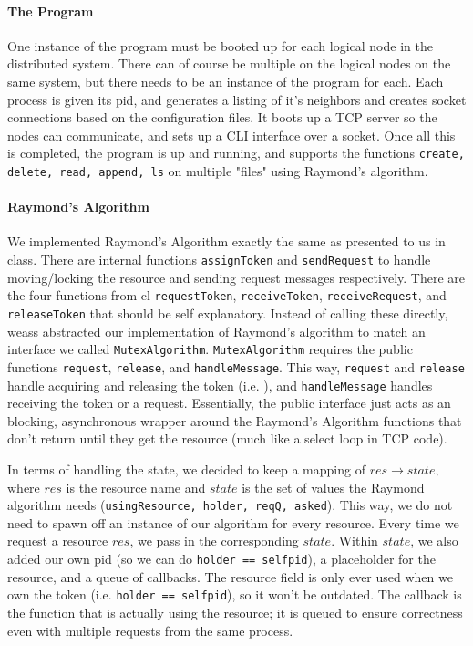 \documentclass{article}
\begin{document}
\paragraph*{The Program}
One instance of the program must be booted up for each logical node in the distributed system. There can of course be multiple on the logical nodes on the same system, but there needs to be an instance of the program for each. Each process is given its pid, and generates a listing of it's neighbors and creates socket connections based on the configuration files. It boots up a TCP server so the nodes can communicate, and sets up a CLI interface over a socket. Once all this is completed, the program is up and running, and supports the functions \texttt{create, delete, read, append, ls} on multiple "files" using Raymond's algorithm.
 

\paragraph*{Raymond's Algorithm}
We implemented Raymond's Algorithm exactly the same as presented to us in class. There are internal functions \texttt{assignToken} and \texttt{sendRequest} to handle moving/locking the resource and sending request messages respectively. There are the four functions from cl \texttt{requestToken}, \texttt{receiveToken}, \texttt{receiveRequest}, and \texttt{releaseToken} that should be self explanatory. Instead of calling these directly, weass abstracted our implementation  of Raymond's algorithm to match an interface we called \texttt{MutexAlgorithm}. \texttt{MutexAlgorithm} requires the public functions \texttt{request}, \texttt{release}, and \texttt{handleMessage}. This way, \texttt{request} and \texttt{release} handle acquiring and releasing the token (i.e. ), and \texttt{handleMessage} handles receiving the token or a request. Essentially, the public interface just acts as an blocking, asynchronous wrapper around the Raymond's Algorithm functions that don't return until they get the resource (much like a select loop in TCP code).

In terms of handling the state, we decided to keep a mapping of $res \to state$, where $res$ is the resource name and $state$ is the set of values the Raymond algorithm needs (\texttt{usingResource, holder, reqQ, asked}). This way, we do not need to spawn off an instance of our algorithm for every resource. Every time we request a resource $res$, we pass in the corresponding $state$. Within $state$, we also added our own pid (so we can do \texttt{holder == selfpid}), a placeholder for the resource, and a queue of callbacks. The resource field is only ever used when we own the token (i.e. \texttt{holder == selfpid}), so it won't be outdated. The callback is the function that is actually using the resource; it is queued to ensure correctness even with multiple requests from the same process.
\end{document}
